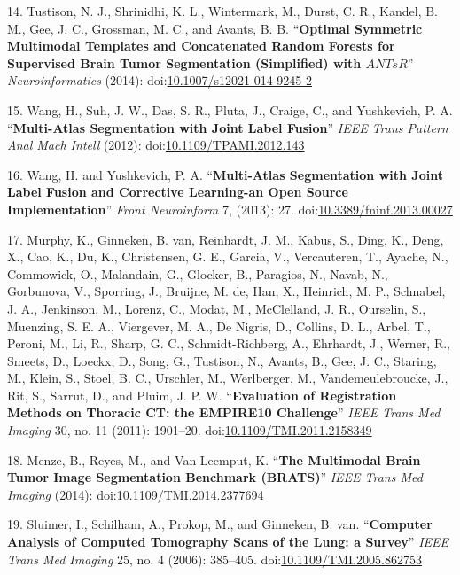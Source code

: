\documentclass[11pt,]{article}
\begin{document}
14. Tustison, N. J., Shrinidhi, K. L., Wintermark, M., Durst, C. R.,
Kandel, B. M., Gee, J. C., Grossman, M. C., and Avants, B. B.
``\textbf{Optimal Symmetric Multimodal Templates and Concatenated Random
Forests for Supervised Brain Tumor Segmentation (Simplified) with
$ANTsR$}'' \emph{Neuroinformatics} (2014):
doi:\href{http://dx.doi.org/10.1007/s12021-014-9245-2}{10.1007/s12021-014-9245-2}

15. Wang, H., Suh, J. W., Das, S. R., Pluta, J., Craige, C., and
Yushkevich, P. A. ``\textbf{Multi-Atlas Segmentation with Joint Label
Fusion}'' \emph{IEEE Trans Pattern Anal Mach Intell} (2012):
doi:\href{http://dx.doi.org/10.1109/TPAMI.2012.143}{10.1109/TPAMI.2012.143}

16. Wang, H. and Yushkevich, P. A. ``\textbf{Multi-Atlas Segmentation
with Joint Label Fusion and Corrective Learning-an Open Source
Implementation}'' \emph{Front Neuroinform} 7, (2013): 27.
doi:\href{http://dx.doi.org/10.3389/fninf.2013.00027}{10.3389/fninf.2013.00027}

17. Murphy, K., Ginneken, B. van, Reinhardt, J. M., Kabus, S., Ding, K.,
Deng, X., Cao, K., Du, K., Christensen, G. E., Garcia, V., Vercauteren,
T., Ayache, N., Commowick, O., Malandain, G., Glocker, B., Paragios, N.,
Navab, N., Gorbunova, V., Sporring, J., Bruijne, M. de, Han, X.,
Heinrich, M. P., Schnabel, J. A., Jenkinson, M., Lorenz, C., Modat, M.,
McClelland, J. R., Ourselin, S., Muenzing, S. E. A., Viergever, M. A.,
De Nigris, D., Collins, D. L., Arbel, T., Peroni, M., Li, R., Sharp, G.
C., Schmidt-Richberg, A., Ehrhardt, J., Werner, R., Smeets, D., Loeckx,
D., Song, G., Tustison, N., Avants, B., Gee, J. C., Staring, M., Klein,
S., Stoel, B. C., Urschler, M., Werlberger, M., Vandemeulebroucke, J.,
Rit, S., Sarrut, D., and Pluim, J. P. W. ``\textbf{Evaluation of
Registration Methods on Thoracic CT: the EMPIRE10 Challenge}''
\emph{IEEE Trans Med Imaging} 30, no. 11 (2011): 1901--20.
doi:\href{http://dx.doi.org/10.1109/TMI.2011.2158349}{10.1109/TMI.2011.2158349}

18. Menze, B., Reyes, M., and Van Leemput, K. ``\textbf{The Multimodal
Brain Tumor Image Segmentation Benchmark (BRATS)}'' \emph{IEEE Trans Med
Imaging} (2014):
doi:\href{http://dx.doi.org/10.1109/TMI.2014.2377694}{10.1109/TMI.2014.2377694}

19. Sluimer, I., Schilham, A., Prokop, M., and Ginneken, B. van.
``\textbf{Computer Analysis of Computed Tomography Scans of the Lung: a
Survey}'' \emph{IEEE Trans Med Imaging} 25, no. 4 (2006): 385--405.
doi:\href{http://dx.doi.org/10.1109/TMI.2005.862753}{10.1109/TMI.2005.862753}
\end{document}

